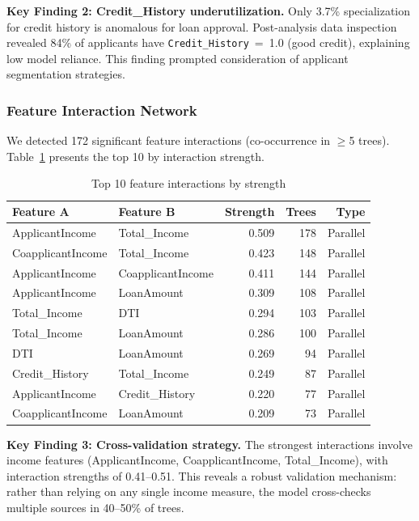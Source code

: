 \textbf{Key Finding 2: Credit\_History underutilization.}
Only 3.7\% specialization for credit history is anomalous for loan approval. Post-analysis data inspection revealed 84\% of applicants have \texttt{Credit\_History}~=~1.0 (good credit), explaining low model reliance. This finding prompted consideration of applicant segmentation strategies.

\subsubsection{Feature Interaction Network}

We detected 172 significant feature interactions (co-occurrence in $\geq$5 trees). Table~\ref{tab:interactions} presents the top 10 by interaction strength.

\begin{table}[htp]
\caption{Top 10 feature interactions by strength}
\label{tab:interactions}
\centering
\small
\begin{tabular}{llrrr}
\toprule
\textbf{Feature A} & \textbf{Feature B} & \textbf{Strength} & \textbf{Trees} & \textbf{Type} \\
\midrule
ApplicantIncome    & Total\_Income      & 0.509 & 178 & Parallel \\
CoapplicantIncome  & Total\_Income      & 0.423 & 148 & Parallel \\
ApplicantIncome    & CoapplicantIncome  & 0.411 & 144 & Parallel \\
ApplicantIncome    & LoanAmount         & 0.309 & 108 & Parallel \\
Total\_Income      & DTI                & 0.294 & 103 & Parallel \\
Total\_Income      & LoanAmount         & 0.286 & 100 & Parallel \\
DTI                & LoanAmount         & 0.269 &  94 & Parallel \\
Credit\_History    & Total\_Income      & 0.249 &  87 & Parallel \\
ApplicantIncome    & Credit\_History    & 0.220 &  77 & Parallel \\
CoapplicantIncome  & LoanAmount         & 0.209 &  73 & Parallel \\
\bottomrule
\end{tabular}
\end{table}

\textbf{Key Finding 3: Cross-validation strategy.}
The strongest interactions involve income features (ApplicantIncome, CoapplicantIncome, Total\_Income), with interaction strengths of 0.41--0.51. This reveals a robust validation mechanism: rather than relying on any single income measure, the model cross-checks multiple sources in 40--50\% of trees.

